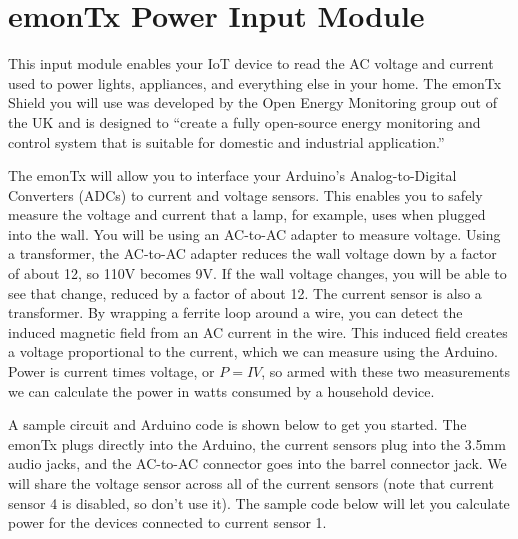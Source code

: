 

\clearpage
\section{emonTx Power Input Module}
\label{sec-input-power}

This input module enables your IoT device to read the AC voltage and current
used to power lights, appliances, and everything else in your home.  The emonTx
Shield you will use was developed by the Open Energy Monitoring group out of the
UK and is designed to ``create a fully open-source energy monitoring and control
system that is suitable for domestic and industrial application.''  

The emonTx will allow you to interface your Arduino's Analog-to-Digital
Converters (ADCs) to current and voltage sensors.  This enables you to safely
measure the voltage and current that a lamp, for example, uses when plugged into
the wall.  You will be using an AC-to-AC adapter to measure voltage. Using a
transformer, the AC-to-AC adapter reduces the wall voltage down by a factor of
about 12, so 110V becomes 9V.  If the wall voltage changes, you will be able to
see that change, reduced by a factor of about 12.  The current sensor is also a
transformer.  By wrapping a ferrite loop around a wire, you can detect the
induced magnetic field from an AC current in the wire.  This induced field
creates a voltage proportional to the current, which we can measure using the
Arduino.  Power is current times voltage, or $P=IV$, so armed with these two
measurements we can calculate the power in watts consumed by a household device.

A sample circuit and Arduino code is shown below to get you started.  
The emonTx plugs directly into the Arduino, the current sensors plug into the
3.5mm audio jacks, and the AC-to-AC connector goes into the barrel connector
jack.  We will share the voltage sensor across all of the current sensors (note
that current sensor 4 is disabled, so don't use it).  The sample code below will
let you calculate power for the devices connected to current sensor 1.

